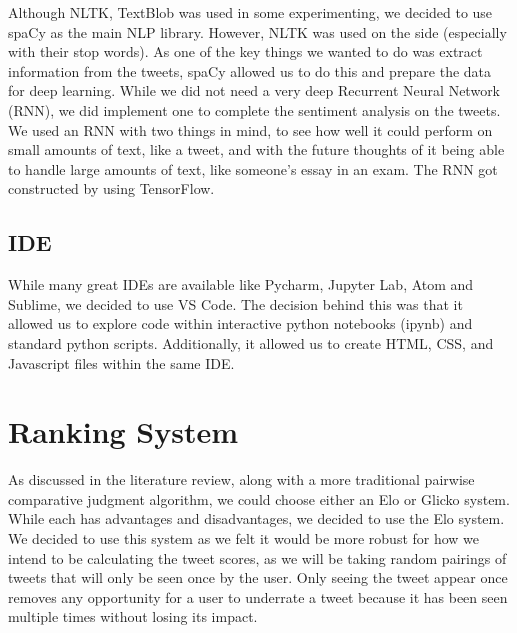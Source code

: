 	
	
	Although NLTK, TextBlob was used in some experimenting, we decided to use spaCy as the main NLP library. However, NLTK was used on the side (especially with their stop words). As one of the key things we wanted to do was extract information from the tweets, spaCy allowed us to do this and prepare the data for deep learning. While we did not need a very deep Recurrent Neural Network (RNN), we did implement one to complete the sentiment analysis on the tweets. We used an RNN with two things in mind, to see how well it could perform on small amounts of text, like a tweet, and with the future thoughts of it being able to handle large amounts of text, like someone's essay in an exam. The RNN got constructed by using TensorFlow.
	
	\subsection{IDE}
	While many great IDEs are available like Pycharm, Jupyter Lab, Atom and Sublime, we decided to use VS Code. The decision behind this was that it allowed us to explore code within interactive python notebooks (ipynb) and standard python scripts. Additionally, it allowed us to create HTML, CSS, and Javascript files within the same IDE.
	
	
	\section{Ranking System}
	
	As discussed in the literature review, along with a more traditional pairwise comparative judgment algorithm, we could choose either an Elo or Glicko system. While each has advantages and disadvantages, we decided to use the Elo system. We decided to use this system as we felt it would be more robust for how we intend to be calculating the tweet scores, as we will be taking random pairings of tweets that will only be seen once by the user. Only seeing the tweet appear once removes any opportunity for a user to underrate a tweet because it has been seen multiple times without losing its impact. 
	
